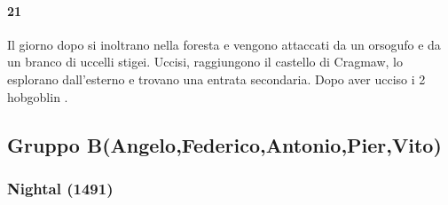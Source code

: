 \documentclass{article}
\begin{document}
          \paragraph{21}  
            Il giorno dopo si inoltrano nella foresta e vengono attaccati da un orsogufo e da un branco di uccelli stigei. Uccisi, raggiungono il castello di Cragmaw, lo esplorano dall'esterno e trovano una entrata secondaria. Dopo aver ucciso i 2 hobgoblin .
          \subsection{Gruppo B(Angelo,Federico,Antonio,Pier,Vito)}
              \subsubsection{Nightal (1491)}
\end{document}
